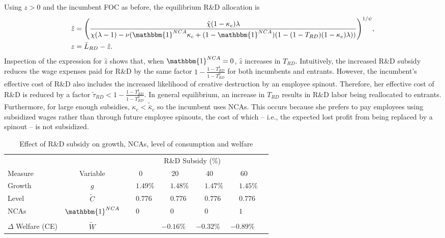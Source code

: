 \documentclass[11pt,english]{article}
\theoremstyle{definition}
\begin{document}
Using $z > 0$ and the incumbent FOC as before, the equilibrium R\&D allocation is
\begin{align}
	\hat{z} &= \Bigg( \frac{\hat{\chi} (1-\kappa_{e}) \lambda}{\chi(\lambda -1) - \nu (\mathbbm{1}^{NCA}\kappa_c + (1-\mathbbm{1}^{NCA})(1 - (1-T_{RD})(1-\kappa_e)\lambda)) } \Bigg)^{1/\psi}, \label{eq:effort_entrant_RDsubsidy} \\
	z &= \bar{L}_{RD} - \hat{z}.
\end{align}
Inspection of the expression for $\hat{z}$ shows that, when $\mathbbm{1}^{NCA} = 0$, $\hat{z}$ increases in $T_{RD}$. Intuitively, the increased R\&D subsidy reduces the wage expenses paid for R\&D by the same factor $1-\frac{1-T_{RD}^1}{1-T_{RD}^0}$ for both incumbents and entrants. However, the incumbent's effective cost of R\&D also includes the increased likelihood of creative destruction by an employee spinout. Therefore, her effective cost of R\&D is reduced by a factor $\tilde{\tau}_{RD} < 1-\frac{1-T_{RD}^1}{1-T_{RD}^0}$. In general equilibrium, an increase in $T_{RD}$ results in R\&D labor being reallocated to entrants. Furthermore, for large enough subsidies, $\kappa_c < \tilde{\bar{\kappa}}_c$ so the incumbent uses NCAs. This occurs because she prefers to pay employees using subsidized wages rather than through future employee spinouts, the cost of which -- i.e., the expected lost profit from being replaced by a spinout -- is not subsidized.

\begin{table}
	\centering
	\caption{Effect of R\&D subsidy on growth, NCAs, level of consumption and welfare}\label{rdsubsidy_table}
	\begin{tabular}{lclllll}
		\toprule \toprule
		&  & \multicolumn{4}{c}{R\&D Subsidy (\%)} \vspace{3pt} \tabularnewline
		Measure &Variable & \multicolumn{1}{c}{0} & \multicolumn{1}{c}{20} & \multicolumn{1}{c}{40} & \multicolumn{1}{c}{60} \tabularnewline
		\midrule
		Growth & $g$ & $\phantom{-}1.49\%$ & $\phantom{-}1.48\%$ & $\phantom{-}1.47\%$ & $\phantom{-}1.45\%$ \tabularnewline
		Level & $\tilde{C}$  & $\phantom{-}0.776$ &  $\phantom{-}0.776$ & $\phantom{-}0.776$ & $\phantom{-}0.776$ \tabularnewline 
		NCAs & $\mathbbm{1}^{NCA}$ & $\phantom{-}0$ & $\phantom{-}0$ & $\phantom{-}0$ & $\phantom{-}1$ \tabularnewline
		\tabularnewline
		$\Delta$ Welfare (CE) & $\tilde{W}$  &  & $- 0.16\%$ & $- 0.32\%$ & $- 0.89\%$ \tabularnewline
		\bottomrule
	\end{tabular}
\end{table}
\end{document}
